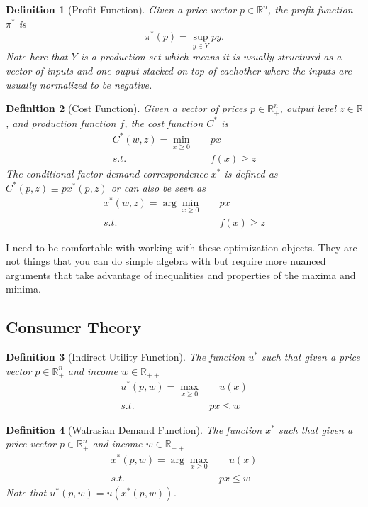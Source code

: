 \documentclass[11pt,english]{article}
\newtheorem{definition}{Definition}[section]
\begin{document}
\begin{definition}[Profit Function]
Given a price vector $p\in \mathbb{R}^n$, the profit function $\pi^*$ is $$\pi^*(p) = \sup_{y\in Y} py.$$ Note here that $Y$ is a production set which means it is usually structured as a vector of inputs and one ouput stacked on top of eachother where the inputs are usually normalized to be negative.
\end{definition}

\begin{definition}[Cost Function]
Given a vector of prices $p\in \mathbb{R}^n_+$, output level $z\in \mathbb{R}$, and production function $f$, the cost function $C^*$ is \begin{align*}
C^*(w,z) = \min_{x \geq 0}&\quad px\\
s.t.&\quad f(x) \geq z
\end{align*}
The conditional factor demand correspondence $x^*$ is defined as $C^*(p,z) \equiv p x^*(p,z)$ or can also be seen as \begin{align*}
x^*(w,z) = \arg\min_{x \geq 0}&\quad px\\
s.t.&\quad f(x) \geq z
\end{align*}
\end{definition}

I need to be comfortable with working with these optimization objects. They are not things that you can do simple algebra with but require more nuanced arguments that take advantage of inequalities and properties of the maxima and minima.

\subsection{Consumer Theory}

\begin{definition}[Indirect Utility Function]
The function $u^*$ such that given a price vector $p \in \mathbb{R}_+^n$ and income $w \in \mathbb{R}_{++}$ \begin{align*}
u^*(p,w) = \max_{x \geq 0} & \quad u(x)\\
s.t. \quad & px \leq w
\end{align*}
\end{definition}

\begin{definition}[Walrasian Demand Function]
The function $x^*$ such that given a price vector $p \in \mathbb{R}_+^n$ and income $w \in \mathbb{R}_{++}$ \begin{align*}
x^*(p,w) = \arg\max_{x \geq 0} & \quad u(x)\\
s.t. \quad & px \leq w
\end{align*} Note that $u^*(p,w) = u(x^*(p,w))$.
\end{definition}
\end{document}
